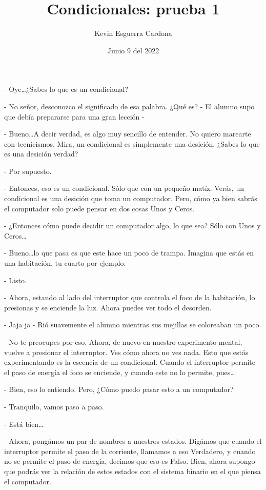 \documentclass[12pt, letterpaper]{article}
\title{Condicionales: prueba 1}
\author{Kevin Esguerra Cardona}
\date{Junio 9 del 2022}
\begin{document}
    
\maketitle

- Oye\dots ¿Sabes lo que es un condicional?

- No señor, desconozco el significado de esa palabra. ¿Qué es? - El alumno supo que debía prepararse para una gran lección -

- Bueno\dots A decir verdad, es algo muy sencillo de entender. No quiero marearte con tecnicismos. Mira, un condicional es simplemente una
desición. ¿Sabes lo que es una desición verdad?

- Por supuesto.

- Entonces, eso es un condicional. Sólo que con un pequeño matíz. Verás, un condicional es una desición que toma un computador. Pero, cómo
ya bien sabrás el computador solo puede pensar en dos cosas Unos y Ceros. 

- ¿Entonces cómo puede decidir un computador algo, lo que sea? Sólo con Unos y Ceros\dots

- Bueno\dots lo que pasa es que este hace un poco de trampa. Imagina que estás en una habitación, tu cuarto por ejemplo. 

- Listo.

- Ahora, estando al lado del interruptor que controla el foco de la \newline habitación, lo presionas y se enciende la luz. Ahora puedes ver todo el
desorden. 

- Jaja ja - Rió suavemente el alumno mientras sus mejillas se coloreaban un poco.

- No te preocupes por eso. Ahora, de nuevo en nuestro experimento mental, vuelve a presionar el interruptor. Ves cómo ahora no ves nada. Esto
que estás experimentando es la escencia de un condicional. Cuando el interruptor permite el paso de energía el foco se enciende, y cuando este
no lo permite, pues\dots 

- Bien, eso lo entiendo. Pero, ¿Cómo puedo pasar esto a un computador?

- Tranquilo, vamos paso a paso. 

- Está bien\dots

- Ahora, pongámos un par de nombres a nuestros estados. Digámos que cuando el interruptor permite el paso de la corriente, llamamos a eso 
Verdadero, y cuando no se permite el paso de energía, decimos que eso es Falso. Bien, ahora supongo que podrás ver la relación de estos estados
con el sistema binario en el que piensa el computador.
\end{document}
